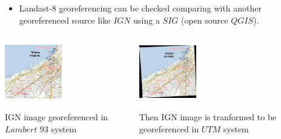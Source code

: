 \documentclass[c]{beamer}
\begin{document}
\begin{frame}
\begin{itemize}
 \item Landast-8 georeferencing can be checked comparing with another georeferenced source like $IGN$ using a $SIG$ (open source $QGIS$).
\end{itemize}

\begin{columns}[t]
\begin{column}{0.30\textwidth}
\begin{overlayarea}{\linewidth}{3cm}
  \centering\vfill
  \includegraphics[height=2.5cm,width=2.5cm]{images/georeferencing/ign-points-Thonon.png}
\end{overlayarea}
\begin{overlayarea}{\linewidth}{2cm}
  \centering
  \scriptsize IGN image georeferenced in $Lambert$ $93$ system\par
\end{overlayarea}
\end{column}
\begin{column}{0.30\textwidth}
\begin{overlayarea}{\linewidth}{3cm}
  \centering\vfill
  \includegraphics[height=2.5cm,width=2.5cm]{images/georeferencing/qgis-resultat.png}
\end{overlayarea}
\begin{overlayarea}{\linewidth}{2cm}
  \centering
  \scriptsize Then IGN image is tranformed to be georeferenced in $UTM$ system\par
\end{overlayarea}

\end{column}
\end{columns}
\end{frame}
\end{document}
